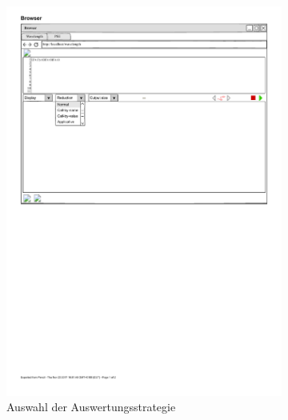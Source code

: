\documentclass[parskip=full,11pt,twoside]{scrartcl}
\begin{document}
\begin{figure}[H]
\begin{subfigure}[m]{0.25\textwidth}
		\includegraphics{img/reductionMenu}
	\caption{\label{fig:awsOptions}Auswahl der Auswertungsstrategie}
	\end{subfigure}
	\hspace*{\fill}
	\begin{subfigure}[r]{0.25\textwidth}
	\centering

\end{subfigure}
\end{figure}
\end{document}
